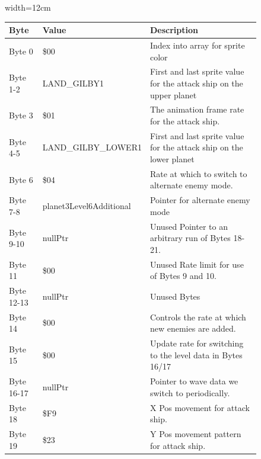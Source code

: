\begin{figure}[H]
  {
  \setlength{\tabcolsep}{3.0pt}
  \setlength\cmidrulewidth{\heavyrulewidth} %
  \begin{adjustbox}{width=12cm}

\begin{tabular}{lll}
\toprule
 Byte       & Value                   & Description                                                         \\
\midrule
 Byte 0     & \$00                     & Index into array for sprite color                                   \\
 Byte 1-2   & LAND\_GILBY1             & First and last sprite value for the attack ship on the upper planet \\
 Byte 3     & \$01                     & The animation frame rate for the attack ship.                       \\
 Byte 4-5   & LAND\_GILBY\_LOWER1 & First and last sprite value for the attack ship on the lower planet \\
 Byte 6     & \$04                     & Rate at which to switch to alternate enemy mode.                    \\
 Byte 7-8   & planet3Level6Additional & Pointer for alternate enemy mode                                    \\
 Byte 9-10  & nullPtr                 & Unused Pointer to an arbitrary run of Bytes 18-21.                  \\
 Byte 11    & \$00                     & Unused Rate limit for use of Bytes 9 and 10.                        \\
 Byte 12-13 & nullPtr                 & Unused Bytes                                                        \\
 Byte 14    & \$00                     & Controls the rate at which new enemies are added.                   \\
 Byte 15    & \$00                     & Update rate for switching to the level data in Bytes 16/17          \\
 Byte 16-17 & nullPtr                 & Pointer to wave data we switch to periodically.                     \\
 Byte 18    & \$F9                     & X Pos movement for attack ship.                                     \\
 Byte 19    & \$23                     & Y Pos movement pattern for attack ship.                             \\

\end{tabular}
\end{adjustbox}}
\end{figure}
